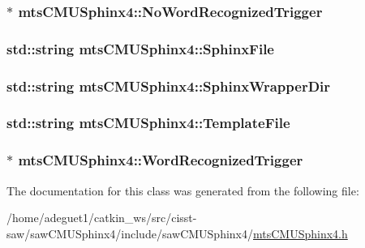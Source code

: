 \hypertarget{classmts_c_m_u_sphinx4_abb3de961c7753e3231b01b3edc593279}{
\subsubsection[{No\-Word\-Recognized\-Trigger}]{$\ast$ mts\-C\-M\-U\-Sphinx4\-::\-No\-Word\-Recognized\-Trigger}}\label{classmts_c_m_u_sphinx4_abb3de961c7753e3231b01b3edc593279}
\hypertarget{classmts_c_m_u_sphinx4_a7bd334f3fc83a2e02835b04c3aa97429}{
\subsubsection[{Sphinx\-File}]{\setlength{\rightskip}{0pt plus 5cm}std\-::string mts\-C\-M\-U\-Sphinx4\-::\-Sphinx\-File}}\label{classmts_c_m_u_sphinx4_a7bd334f3fc83a2e02835b04c3aa97429}
\hypertarget{classmts_c_m_u_sphinx4_a27347a99b66802545ec6c64aa85aebb3}{
\subsubsection[{Sphinx\-Wrapper\-Dir}]{\setlength{\rightskip}{0pt plus 5cm}std\-::string mts\-C\-M\-U\-Sphinx4\-::\-Sphinx\-Wrapper\-Dir}}\label{classmts_c_m_u_sphinx4_a27347a99b66802545ec6c64aa85aebb3}
\hypertarget{classmts_c_m_u_sphinx4_af225e6118d17b5bd9d325a0876d7b2a2}{
\subsubsection[{Template\-File}]{\setlength{\rightskip}{0pt plus 5cm}std\-::string mts\-C\-M\-U\-Sphinx4\-::\-Template\-File}}\label{classmts_c_m_u_sphinx4_af225e6118d17b5bd9d325a0876d7b2a2}
\hypertarget{classmts_c_m_u_sphinx4_a7a05ef0831adccfb72bebfcb22bbfd3b}{
\subsubsection[{Word\-Recognized\-Trigger}]{$\ast$ mts\-C\-M\-U\-Sphinx4\-::\-Word\-Recognized\-Trigger}}\label{classmts_c_m_u_sphinx4_a7a05ef0831adccfb72bebfcb22bbfd3b}


The documentation for this class was generated from the following file\-:\begin{DoxyCompactItemize}
\item 
/home/adeguet1/catkin\-\_\-ws/src/cisst-\/saw/saw\-C\-M\-U\-Sphinx4/include/saw\-C\-M\-U\-Sphinx4/\hyperlink{mts_c_m_u_sphinx4_8h}{mts\-C\-M\-U\-Sphinx4.\-h}\end{DoxyCompactItemize}
